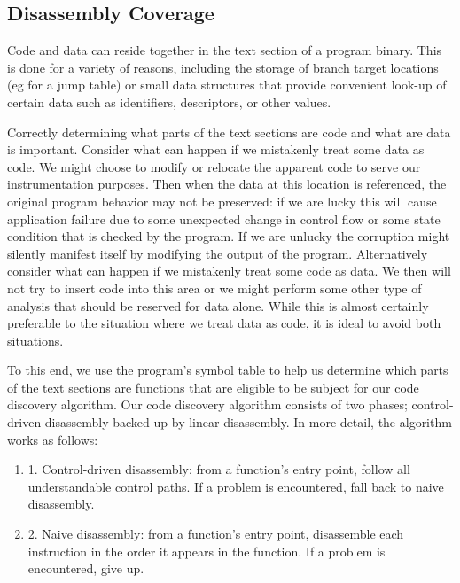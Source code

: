 \subsection{Disassembly Coverage}
Code and data can reside together in the text section of a program binary. This is done for a variety of reasons, including
the storage of branch target locations (eg for a jump table) or small data structures that provide convenient look-up
of certain data such as identifiers, descriptors, or other values.

Correctly determining
what parts of the text sections are code and what are data is important. Consider what can happen
if we mistakenly treat some data as code. We might choose to modify or relocate the apparent code
to serve our instrumentation purposes. Then when the data at this location is referenced, the
original program behavior may not be preserved: if we are lucky this will cause application failure
due to some unexpected change in control flow or some state condition that is checked by the program.
If we are unlucky the corruption might silently manifest itself by modifying the output of the
program. Alternatively consider what can happen if we mistakenly treat some code as data. We then will
not try to insert code into this area or we might perform some other type of analysis that should be reserved for
data alone. While this is almost certainly preferable to the situation where we treat data as code, it
is ideal to avoid both situations.

To this end, we use the program's symbol table to help us determine which parts of the text sections
are functions that are eligible to be subject for our code discovery algorithm. Our code discovery algorithm
consists of two phases; control-driven disassembly backed up by linear disassembly. In more detail, the algorithm
works as follows:

\begin{enumerate}
\item 
1. Control-driven disassembly: from a function's entry point, follow all understandable control paths. If a problem is encountered, fall back to
naive disassembly.
\item
2. Naive disassembly: from a function's entry point, disassemble each instruction in the order it appears in the
function. If a problem is encountered, give up.
\end{enumerate}


